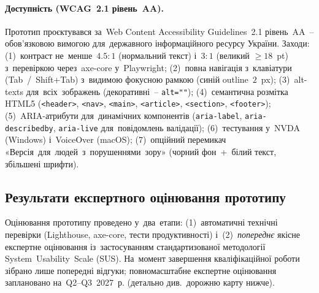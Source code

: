 \paragraph{Доступність (WCAG~2.1 рівень~AA).} Прототип проєктувався за~Web Content Accessibility Guidelines~2.1 рівень~AA~-- обов'язковою вимогою для~державного інформаційного ресурсу України. Заходи: (1)~контраст не~менше~$4.5{:}1$ (нормальний текст) і~$3{:}1$ (великий $\geq 18$~pt) з~перевіркою через~axe-core у~Playwright; (2)~повна навігація з~клавіатури (Tab~/~Shift+Tab) з~видимою фокусною рамкою (синій outline~$2$~px); (3)~alt-texts для~всіх~зображень (декоративні~-- \texttt{alt=""}); (4)~семантична розмітка HTML5 (\texttt{<header>}, \texttt{<nav>}, \texttt{<main>}, \texttt{<article>}, \texttt{<section>}, \texttt{<footer>}); (5)~ARIA-атрибути для~динамічних компонентів (\texttt{aria-label}, \texttt{aria-describedby}, \texttt{aria-live} для~повідомлень валідації); (6)~тестування у~NVDA (Windows) і~VoiceOver (macOS); (7)~опційний перемикач «Версія~для~людей~з~порушеннями~зору» (чорний фон~+~білий текст, збільшені шрифти).

\subsection{Результати експертного оцінювання прототипу}
\label{sec:p3-eval}
\label{sec:p3-eval-method}

Оцінювання прототипу проведено у~два~етапи: (1)~автоматичні технічні перевірки (Lighthouse, axe-core, тести продуктивності) і~(2)~\emph{попереднє} якісне експертне оцінювання із~застосуванням стандартизованої методології System~Usability~Scale (SUS). На~момент завершення кваліфікаційної роботи зібрано лише попередні відгуки; повномасштабне експертне оцінювання заплановано на~Q2--Q3~2027~р. (детально див.\ дорожню карту нижче).

